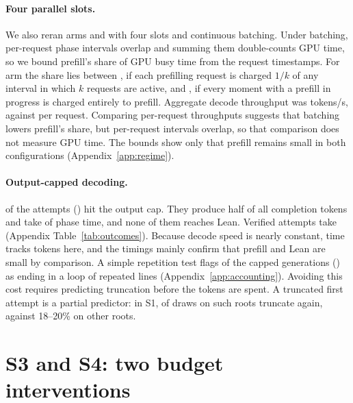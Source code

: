 \paragraph{Four parallel slots.}
We also reran arms  and  with four slots and continuous batching.  Under batching, per-request phase intervals overlap and summing them double-counts GPU time, so we bound prefill's share of GPU busy time from the request timestamps.  For arm  the share lies between \CrFourCLower{}, if each prefilling request is charged $1/k$ of any interval in which $k$ requests are active, and \CrFourCUpper{}, if every moment with a prefill in progress is charged entirely to prefill.  Aggregate decode throughput was \CrFourCAggDecode{} tokens/s, against \CrFourCReqDecode{} per request.  Comparing per-request throughputs suggests that batching lowers prefill's share, but per-request intervals overlap, so that comparison does not measure GPU time.  The bounds show only that prefill remains small in both configurations (Appendix~\ref{app:regime}).

\paragraph{Output-capped decoding.}
\TruncatedN{} of the \AllBranches{} attempts (\TruncatedBranchShare{}) hit the output cap.  They produce half of all completion tokens and take \TruncatedTotalShare{} of phase time, and none of them reaches Lean.  Verified attempts take \VerifiedTotalShare{} (Appendix Table~\ref{tab:outcomes}).  Because decode speed is nearly constant, time tracks tokens here, and the timings mainly confirm that prefill and Lean are small by comparison.  A simple repetition test flags \CrLoopN{} of the \CrLoopOf{} capped generations (\CrLoopRate{}) as ending in a loop of repeated lines (Appendix~\ref{app:accounting}).  Avoiding this cost requires predicting truncation before the tokens are spent.  A truncated first attempt is a partial predictor: in S1, \CrBOneTruncPersist{} of draws on such roots truncate again, against 18--20\% on other roots.

\section{S3 and S4: two budget interventions}
\label{sec:allocation}

